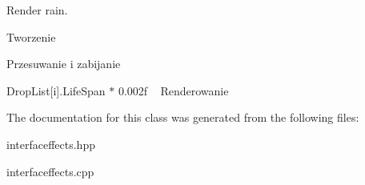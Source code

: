 Render rain. 

Tworzenie

Przesuwanie i zabijanie

Drop\+List\mbox{[}i\mbox{]}.Life\+Span $\ast$ 0.\+002f ~\newline
 Renderowanie 

The documentation for this class was generated from the following files\+:\begin{DoxyCompactItemize}
\item 
interfaceffects.\+hpp\item 
interfaceffects.\+cpp\end{DoxyCompactItemize}
